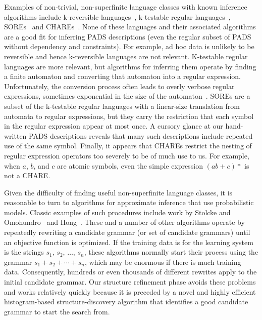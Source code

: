 Examples of non-trivial, non-superfinite
language classes with known inference algorithms include
k-reversible languages~\cite{angluin:revesible-language-inference},
k-testable regular languages~\cite{garcia+:k-testable-languages},
SOREs~\cite{bex+:dtd-inference} and CHAREs~\cite{bex+:dtd-inference}.
None of these languages and their associated algorithms 
are a good fit for inferring PADS descriptions (even the
regular subset of PADS without dependency and constraints).  
For example, ad hoc data is unlikely to be reversible and hence
k-reversible languages are not relevant.  K-testable regular languages are
more relevant, but algorithms for inferring them
operate by finding a finite automaton and converting that 
automaton into a regular expression.  Unfortunately, the conversion process
often leads to overly verbose regular expressions, sometimes 
exponential in the size of the automaton~\cite{bex+:dtd-inference}. 
SOREs are a subset of the k-testable
regular languages with a linear-size translation from automata to
regular expressions, but they carry the restriction that each symbol
in the regular expression appear at most once.  A cursory glance at
our hand-written PADS descriptions reveals that many such descriptions
include repeated use of the same symbol.  Finally, it appears that
CHAREs restrict the nesting of regular expression operators too severely to 
be of much use to us.  For example, when $a$, $b$, and $c$ are atomic symbols,
even the simple expression $(ab + c)*$ is not a CHARE.

Given the difficulty of finding useful non-superfinite language classes,
it is reasonable to turn to algorithms for approximate
inference that use probabilistic models.    
Classic examples of such procedures include work by Stolcke and
Omohundro~\cite{stolcke94inducing} 
and 
Hong~\cite{hong:thesis,hong01using}.  These and a number of other algorithms
operate by repeatedly rewriting a candidate grammar (or set of candidate
grammars) until an objective function is optimized.
If the training data is for the learning system is the strings
$s_1$, $s_2$, $\ldots$, $s_n$, these algorithms normally start their
process using the grammar $s_1 + s_2 + \cdots + s_n$, which may
be enormous if there is much training data.  
Consequently, hundreds or even thousands of different rewrites apply to the
initial candidate grammar.  Our structure refinement
phase avoids these problems and works relatively quickly 
because it is preceded by a novel and highly efficient
histogram-based structure-discovery algorithm 
that identifies a good candidate grammar to start the search from.  

